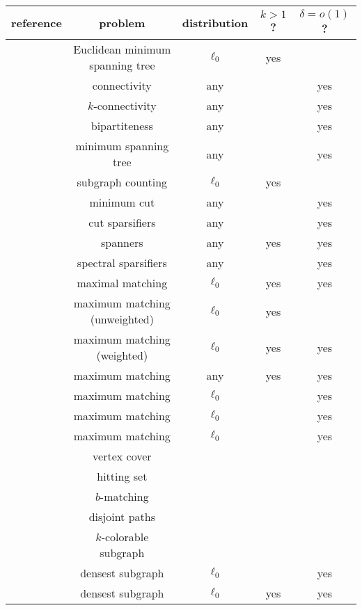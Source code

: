 \begin{figure*}[t]
\begin{center}
\begin{tabular}{|c|c|c|c|c|}
\hline
reference & problem & distribution & $k>1$? & $\delta = o(1)$?\\
\hline
\cite{FrahlingIS08} & Euclidean minimum spanning tree & $\ell_0$ & yes &\\
\hline
\cite{AhnGM12a} & connectivity\footnotemark & any & & yes\\
\hline
\cite{AhnGM12a} & $k$-connectivity & any & & yes\\
\hline
\cite{AhnGM12a} & bipartiteness & any & & yes\\
\hline
\cite{AhnGM12a} & minimum spanning tree & any & & yes\\
\hline
\cite{AhnGM12b} & subgraph counting & $\ell_0$ & yes & \\
\hline
\cite{AhnGM12b} & minimum cut & any &  & yes\\
\hline
\cite{AhnGM12b} & cut sparsifiers & any &  & yes\\
\hline
\cite{AhnGM12b} & spanners & any & yes & yes\\
\hline
\cite{AhnGM12b} & spectral sparsifiers & any &  & yes\\
\hline
\cite{ChitnisCHM15} & maximal matching & $\ell_0$ & yes & yes\\
\hline
\cite{BuryS15} & maximum matching (unweighted) & $\ell_0$ & yes & \\
& maximum matching (weighted) & $\ell_0$ & yes & yes \\
\hline
\cite{Konrad15} & maximum matching & any & yes & yes \\
\hline
\cite{AssadiKLY16} & maximum matching & $\ell_0$ & & yes \\
\hline
\cite{AssadiKL17} & maximum matching & $\ell_0$ & & yes \\
\hline
\cite{ChitnisCEHMMV16} & maximum matching & $\ell_0$ & & yes \\
& vertex cover &  & &  \\
& hitting set &  & &  \\
& $b$-matching &  & &  \\
& disjoint paths &  & &  \\
& $k$-colorable subgraph & & & \\
\hline
\cite{BhattacharyaHNT15} & densest subgraph & $\ell_0$ & & yes \\
\hline
\cite{McGregorTVV15} & densest subgraph & $\ell_0$ & yes & yes \\

\end{tabular}
\end{center}
\end{figure*}
